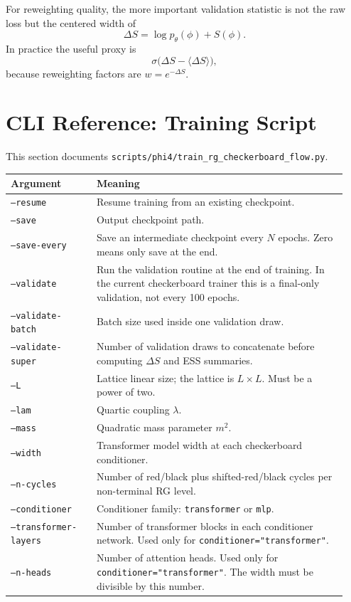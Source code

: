 \documentclass[11pt]{article}
\begin{document}
For reweighting quality, the more important validation statistic is not the raw
loss but the centered width of
\[
\Delta S = \log p_\theta(\phi) + S(\phi).
\]
In practice the useful proxy is
\[
\sigma\bigl(\Delta S - \langle \Delta S\rangle\bigr),
\]
because reweighting factors are $w = e^{-\Delta S}$.

\section{CLI Reference: Training Script}

This section documents
\texttt{scripts/phi4/train\_rg\_checkerboard\_flow.py}.

\begin{longtable}{p{0.24\linewidth}p{0.70\linewidth}}
\toprule
Argument & Meaning \\
\midrule
\endhead
\texttt{--resume} & Resume training from an existing checkpoint. \\
\texttt{--save} & Output checkpoint path. \\
\texttt{--save-every} & Save an intermediate checkpoint every $N$ epochs. Zero means only save at the end. \\
\texttt{--validate} & Run the validation routine at the end of training. In the current checkerboard trainer this is a final-only validation, not every 100 epochs. \\
\texttt{--validate-batch} & Batch size used inside one validation draw. \\
\texttt{--validate-super} & Number of validation draws to concatenate before computing $\Delta S$ and ESS summaries. \\
\texttt{--L} & Lattice linear size; the lattice is $L\times L$. Must be a power of two. \\
\texttt{--lam} & Quartic coupling $\lambda$. \\
\texttt{--mass} & Quadratic mass parameter $m^2$. \\
\texttt{--width} & Transformer model width at each checkerboard conditioner. \\
\texttt{--n-cycles} & Number of red/black plus shifted-red/black cycles per non-terminal RG level. \\
\texttt{--conditioner} & Conditioner family: \texttt{transformer} or \texttt{mlp}. \\
\texttt{--transformer-layers} & Number of transformer blocks in each conditioner network. Used only for \texttt{conditioner="transformer"}. \\
\texttt{--n-heads} & Number of attention heads. Used only for \texttt{conditioner="transformer"}. The width must be divisible by this number. \\

\end{longtable}
\end{document}
